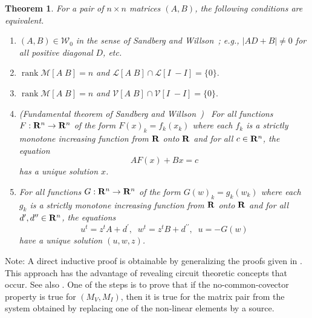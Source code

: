 \documentclass{article}
\newtheorem{theorem}{Theorem}[section]
\DeclareMathOperator{\rank}{rank}
\newcommand{\hmat}[2]{[#1\;#2]}
\begin{document}
\begin{theorem}
\label{sandwillompairtheorem}
For a pair 
%
%
of $n\times n$ 
matrices $(A,B)$, the following conditions are 
equivalent.
%
%
\begin{enumerate}
\item 
$(A,B)\in {\mathcal W}_0$ in the sense of 
Sandberg and 
Willson~\cite{SWExistancePf,W0APPLpaper};
e.g., $|AD+B|\neq 0$ for all positive diagonal $D$, etc.
\item 
$\rank{\mathcal M}\hmat{A}{B}=n$ and 
${\mathcal L}\hmat{A}{B} \cap {\mathcal L}\hmat{I}{-I}=\{0\}.$
\item 
$\rank{\mathcal M}\hmat{A}{B}=n$ and 
${\mathcal V}\hmat{A}{B} \cap {\mathcal V}\hmat{I}{-I}=\{0\}.$
\item 
\textrm{(}Fundamental theorem of Sandberg and 
Willson~\cite{SWExistancePf,W0APPLpaper}\textrm{)}\ 
%
%
For all functions $F:{\bf R}^n\rightarrow {\bf R}^n$ of the form
$F(x)_k=f_k(x_k)$ where each $f_k$ is a strictly 
monotone increasing 
function from 
${\bf R}$ {\em onto} $\bf R$ and for all $c\in {\bf R}^n$, the 
equation
\[
AF(x) + Bx = c
\]
has a unique solution $x$.%
\item 
For all functions $G:{\bf R}^n\rightarrow {\bf R}^n$ of the form
$G(w)_k=g_k(w_k)$ where each $g_k$ is a strictly monotone increasing 
function from ${\bf R}$ {\em onto} $\bf R$ and for all 
$d^{\prime}, d^{\prime\prime}\in {\bf R}^n$, the 
equations
\begin{equation}
\label{W0dualproblem}
u^t=z^tA+d^{\prime},\;\; w^t=z^tB+d^{\prime\prime},\;\; u=-G(w)
\end{equation}
have a unique solution $(u,w,z)$.
\end{enumerate}
\end{theorem}

Note:  A direct inductive proof is obtainable by generalizing 
the proofs given in \cite{HaslerNeirynck}.  This approach has the advantage
of revealing circuit theoretic concepts that occur.  See also
\cite{Fosseprez}.  One of the steps is to prove that if the no-common-covector
property is true for $(M_V,M_I)$, then it is true for the matrix pair 
from the system obtained by replacing one of the non-linear elements by a
source.




%

\end{document}
